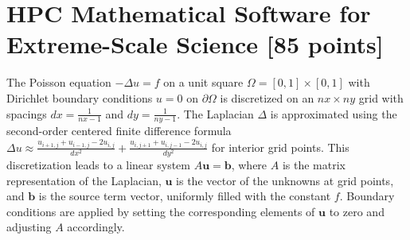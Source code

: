 \documentclass[unicode,11pt,a4paper,oneside,numbers=endperiod,openany]{scrartcl}
\begin{document}
\setassignment

\newline

\assignmentpolicy



\section{HPC Mathematical Software for Extreme-Scale Science  [85 points]}
The Poisson equation $-\Delta u = f$ on a unit square $\Omega = [0, 1] \times [0, 1]$ with Dirichlet boundary conditions $u = 0$ on $\partial \Omega$ is discretized on an $nx \times ny$ grid with spacings $dx = \frac{1}{nx-1}$ and $dy = \frac{1}{ny-1}$. The Laplacian $\Delta$ is approximated using the second-order centered finite difference formula $\Delta u \approx \frac{u_{i+1,j} + u_{i-1,j} - 2u_{i,j}}{dx^2} + \frac{u_{i,j+1} + u_{i,j-1} - 2u_{i,j}}{dy^2}$ for interior grid points. This discretization leads to a linear system $A\mathbf{u} = \mathbf{b}$, where $A$ is the matrix representation of the Laplacian, $\mathbf{u}$ is the vector of the unknowns at grid points, and $\mathbf{b}$ is the source term vector, uniformly filled with the constant $f$. Boundary conditions are applied by setting the corresponding elements of $\mathbf{u}$ to zero and adjusting $A$ accordingly.
\end{document}
